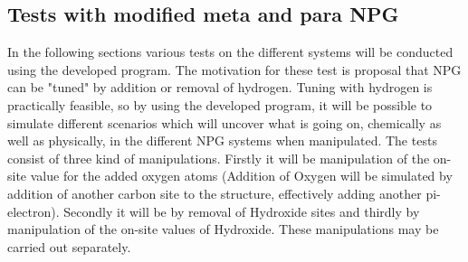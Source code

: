 \subsection{Tests with modified meta and para NPG}
In the following sections various tests on the different systems will be conducted using the developed program. The motivation for these test is proposal that NPG can be "tuned" by addition or removal of hydrogen. Tuning with hydrogen is practically feasible, so by using the developed program, it will be possible to simulate different scenarios which will uncover what is going on, chemically as well as physically, in the different NPG systems when manipulated. The tests consist of three kind of manipulations. Firstly it will be manipulation of the on-site value for the added oxygen atoms (Addition of Oxygen will be simulated by addition of another carbon site to the structure, effectively adding another pi-electron). Secondly it will be by removal of Hydroxide sites and thirdly by manipulation of the on-site values of Hydroxide. These manipulations may be carried out separately. \\
